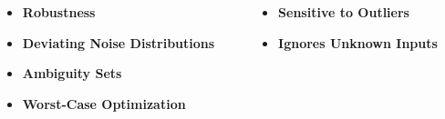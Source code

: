 \documentclass[handout, aspectratio=169]{beamer}
\begin{document}
\begin{frame}
  \frametitle{}
   \begin{columns}[T]
    \begin{column}{0.6\textwidth}
     \begin{tcolorbox}[colbacktitle=greentitle, title=\textbf{Core Idea}]
        \begin{itemize}
            \item<1-> \textbf{Robustness} \pause
            \item<2-> \textbf{Deviating Noise Distributions} \pause
            \item<3-> \textbf{Ambiguity Sets} \pause
            \item<4-> \textbf{Worst-Case Optimization}
        \end{itemize}
    \end{tcolorbox}
         \end{column}
     \begin{column}{0.4\textwidth}
    \begin{tcolorbox}[colbacktitle=redtitle,title=\textbf{Key Limitation}]
        \begin{itemize}
             \item<5-> \textbf{Sensitive to Outliers} \pause
            \item<6-> \textbf{Ignores Unknown Inputs}
        \end{itemize}
    \end{tcolorbox}
     \end{column}
 \end{columns}
\end{frame}
\end{document}
